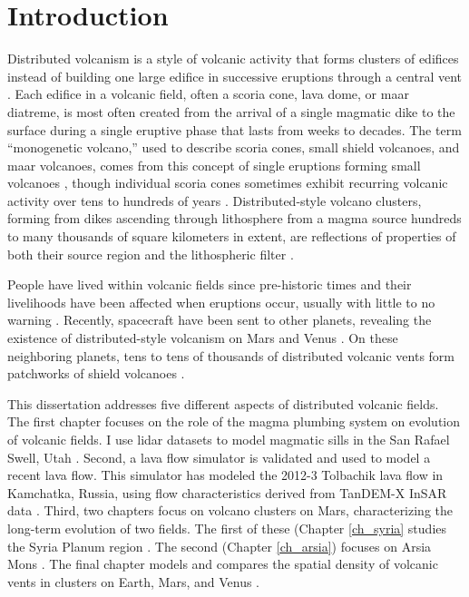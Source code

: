 \chapter[Introduction]{Introduction}

Distributed volcanism is a style of volcanic activity that forms clusters of edifices instead of building one large edifice in successive eruptions through a central vent \citep{valentine2000basaltic}. Each edifice in a volcanic field, often a scoria cone, lava dome, or maar diatreme, is most often created from the arrival of a single magmatic dike to the surface during a single eruptive phase that lasts from weeks to decades. The term ``monogenetic volcano,'' used to describe scoria cones, small shield volcanoes, and maar volcanoes, comes from this concept of single eruptions forming small volcanoes \citep{greeley1977basaltic}, though individual scoria cones sometimes exhibit recurring volcanic activity over tens to hundreds of years \citep{hill1998cerro}. Distributed-style volcano clusters, forming from dikes ascending through lithosphere from a magma source hundreds to many thousands of square kilometers in extent, are reflections of properties of both their source region and the lithospheric filter \citep{settle1979structure}.

People have lived within volcanic fields since pre-historic times and their livelihoods have been affected when eruptions occur, usually with little to no warning \citep{elson2007living}. Recently, spacecraft have been sent to other planets, revealing the existence of distributed-style volcanism on Mars \citep{carr1977some} and Venus \citep{head1992venus}. On these neighboring planets, tens to tens of thousands of distributed volcanic vents form patchworks of shield volcanoes \citep{richardson2013volcanic,miller2012shield}. 

This dissertation addresses five different aspects of distributed volcanic fields. The first chapter focuses on the role of the magma plumbing system on evolution of volcanic fields. I use lidar datasets to model magmatic sills in the San Rafael Swell, Utah \citep{richardson2015sills}. Second, a lava flow simulator is validated and used to model a recent lava flow. This simulator has modeled the 2012-3 Tolbachik lava flow in Kamchatka, Russia, using flow characteristics derived from TanDEM-X InSAR data \citep{kubanek2015lava}. Third, two chapters focus on volcano clusters on Mars, characterizing the long-term evolution of two fields. The first of these (Chapter \ref{ch_syria} studies the Syria Planum region \citep{richardson2013volcanic}. The second (Chapter \ref{ch_arsia}) focuses on Arsia Mons \citep{richardson2015recurrence}. The final chapter models and compares the spatial density of volcanic vents in clusters on Earth, Mars, and Venus \citep{richardson2012comparison}.

